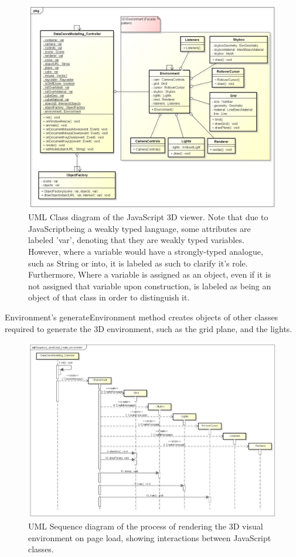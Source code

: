 \begin{figure}[H]
\centering
\includegraphics[width=5in]{Resources//Design_Diagrams//Class_ JavaScript Front-end.png}
\caption{UML Class diagram of the JavaScript 3D viewer. Note that due to JavaScriptbeing a weakly typed language, some attributes are labeled 'var', denoting that they are weakly typed variables. However, where a variable would have a strongly-typed analogue, such as String or into, it is labeled as such to clarify it's role. Furthermore, Where a variable is assigned as an object, even if it is not assigned that variable upon construction, is labeled as being an object of that class in order to distinguish it.}
\label{}
\end{figure}

Environment's generateEnvironment method creates objects of other classes required to generate the 3D environment, such as the grid plane, and the lights.

\begin{figure}[H]
\centering
\includegraphics[width=5in]{Resources//Design_Diagrams//Sequence_JavaScript_create_environment.png}
\caption{UML Sequence diagram of the process of rendering the 3D visual environment on page load, showing interactions between JavaScript classes.}
\label{}
\end{figure}

